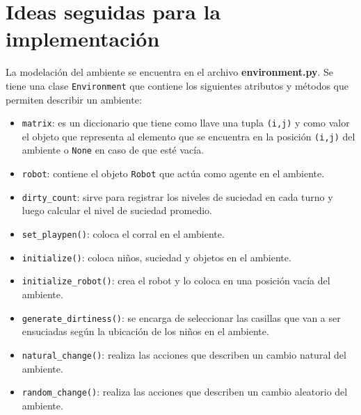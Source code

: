 \documentclass[12pt,a4paper]{article}
\begin{document}
	\section{Ideas seguidas para la implementaci\'on}
	La modelaci\'on del ambiente se encuentra en el archivo \textbf{environment.py}. Se tiene una clase \texttt{Environment} que contiene los siguientes atributos y m\'etodos que permiten describir un ambiente:
	\begin{itemize}
		\item \texttt{matrix}: es un diccionario que tiene como llave una tupla \texttt{(i,j)} y como valor el objeto que representa al elemento que se encuentra en la posici\'on \texttt{(i,j)} del ambiente o \texttt{None} en caso de que est\'e vac\'ia. 
		\item \texttt{robot}: contiene el objeto \texttt{Robot} que act\'ua como agente en el ambiente.
		\item \texttt{dirty\_count}: sirve para registrar los niveles de suciedad en cada turno y luego calcular el nivel de suciedad promedio.
		\item \texttt{set\_playpen()}: coloca el corral en el ambiente.
		\item \texttt{initialize()}: coloca ni\~nos, suciedad y objetos en el ambiente.
		\item \texttt{initialize\_robot()}: crea el robot y lo coloca en una posici\'on vac\'ia del ambiente.
		\item \texttt{generate\_dirtiness()}: se encarga de seleccionar las casillas que van a ser ensuciadas seg\'un la ubicaci\'on de los ni\~nos en el ambiente.
		\item \texttt{natural\_change()}: realiza las acciones que describen un cambio natural del ambiente.
		\item \texttt{random\_change()}: realiza las acciones que describen un cambio aleatorio del ambiente.
	\end{itemize} 
\end{document}
